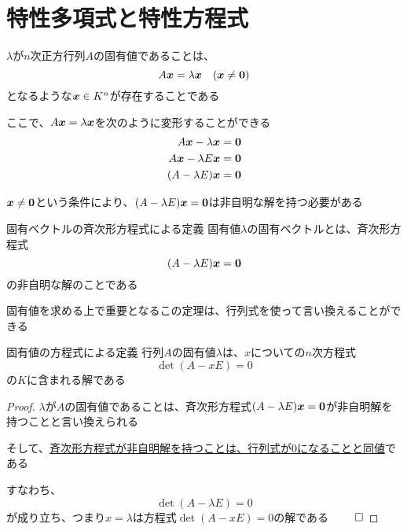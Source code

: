 \documentclass[../../../topic_linear-algebra]{subfiles}
\begin{document}
\sectionline
\section{特性多項式と特性方程式}

$\lambda$が$n$次正方行列$A$の固有値であることは、
\begin{equation*}
  A\vb*{x} = \lambda \vb*{x} \quad (\vb*{x} \neq \vb*{0})
\end{equation*}
となるような$\vb*{x} \in K^n$が存在することである

\br

ここで、$A\vb*{x} = \lambda \vb*{x}$を次のように変形することができる
\begin{align*}
  A\vb*{x} - \lambda \vb*{x}  & = \vb*{0} \\
  A\vb*{x} - \lambda E\vb*{x} & = \vb*{0} \\
  (A - \lambda E)\vb*{x}      & = \vb*{0}
\end{align*}

$\vb*{x} \neq \vb*{0}$という条件により、$(A - \lambda E)\vb*{x} = \vb*{0}$は非自明な解を持つ必要がある

\begin{theorem*}{固有ベクトルの斉次形方程式による定義}
  固有値$\lambda$の固有ベクトルとは、斉次形方程式
  \begin{equation*}
    (A - \lambda E)\vb*{x} = \vb*{0}
  \end{equation*}
  の非自明な解のことである
\end{theorem*}

固有値を求める上で重要となるこの定理は、行列式を使って言い換えることができる

\begin{theorem*}{固有値の方程式による定義}
  行列$A$の固有値$\lambda$は、$x$についての$n$次方程式
  \begin{equation*}
    \det(A - x E) = 0
  \end{equation*}
  の$K$に含まれる解である
\end{theorem*}

\begin{proof}
  $\lambda$が$A$の固有値であることは、斉次形方程式$(A - \lambda E)\vb*{x} = \vb*{0}$が非自明解を持つことと言い換えられる

  そして、\hyperref[thm:homogeneous-solution-iff-det-zero]{斉次形方程式が非自明解を持つことは、行列式が0になることと同値}である

  すなわち、
  \begin{equation*}
    \det(A - \lambda E) = 0
  \end{equation*}
  が成り立ち、つまり$x = \lambda$は方程式$\det(A - xE) = 0$の解である $\qed$
\end{proof}
\end{document}
